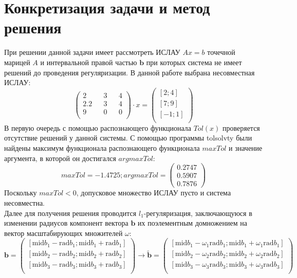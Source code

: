 \documentclass[12pt,a4paper]{scrartcl}
\begin{document}
\section{Конкретизация задачи и метод решения}
При решении данной задачи имеет рассмотреть ИСЛАУ $Ax=b$ точечной марицей $A$ и
интервальной правой частью $\textbf{b}$ при которых система не имеет решений до проведения регуляризации. В данной работе выбрана несовместная ИСЛАУ:
\begin{equation}
    \begin{pmatrix}
    2 && 3 && 4 \\
    2.2 && 3 && 4 \\
    9 && 0 && 0 \\
    \end{pmatrix} \cdot x = 
    \begin{pmatrix}
    [2; 4] \\
    [7; 9] \\
    [-1; 1] \\
    \end{pmatrix}
    \label{islau}
\end{equation}
В первую очередь с помощью распознающего функционала $Tol(x)$ проверяется отсутствие решений у данной системы. С помощью программы
tolsolvty были найдены максимум функционала распознающего функционала $maxTol$ и
значение аргумента, в которой он достигался $argmaxTol$:
\begin{equation}
    maxTol = -1.4725;
    argmaxTol = \begin{pmatrix}
    0.2747 \\
    0.5907 \\
    0.7876
    \end{pmatrix}
    \label{results}
\end{equation}
Поскольку $maxTol < 0$, допусковое множество ИСЛАУ пусто и система несовместна. \\
Далее для получения решения проводится $l_{1}$-регуляризация, заключающуюся в изменении радиусов компонент вектора $\textbf{b}$ их поэлементным домножением на вектор масштабирующих множителей $\omega$:
\begin{equation}
    \textbf{b} = \begin{pmatrix}
    [\text{mid} b_{1} - \text{rad} b_{1}; \text{mid} b_{1} + \text{rad} b_{1}] \\
    [\text{mid} b_{2} - \text{rad} b_{2}; \text{mid}b_{2} + \text{rad} b_{2}] \\
    [\text{mid} b_{3} - \text{rad} b_{3}; \text{mid} b_{3} + \text{rad} b_{3}] \\
    \end{pmatrix} \rightarrow \tilde{\textbf{b}} = \begin{pmatrix}
    [\text{mid} b_{1} - \omega_{1}\text{rad} b_{1}; \text{mid} b_{1} + \omega_{1}\text{rad} b_{1}] \\
    [\text{mid} b_{2} - \omega_{2}\text{rad} b_{2}; \text{mid} b_{2} + \omega_{2}\text{rad} b_{2}] \\
    [\text{mid} b_{3} - \omega_{3}\text{rad} b_{3}; \text{mid} b_{3} + \omega_{3}\text{rad} b_{3}] \\
    \end{pmatrix}
    \label{after_l1_reg}
\end{equation}
\end{document}
